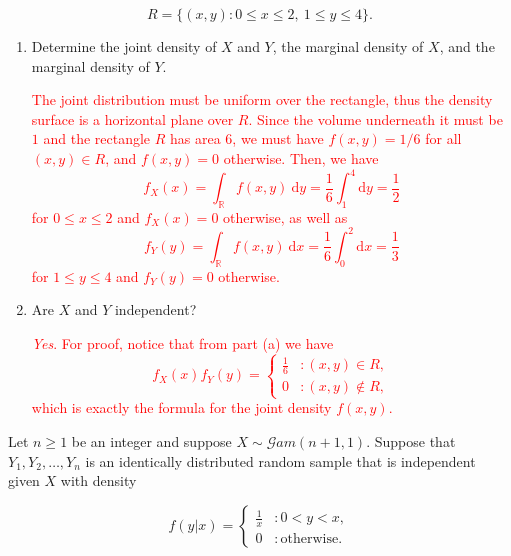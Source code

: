 \documentclass[12pt,reqno]{amsart}
\begin{document}
	\[
	R=\{(x,y) : 0\leq x \leq 2, \ 1\leq y\leq 4\}.
	\]

\medskip
\begin{enumerate}
\item Determine the joint density of $X$ and $Y$, the marginal density of $X$, and the marginal density of $Y$.

\bigskip
\textcolor{red}{The joint distribution must be uniform over the rectangle, thus the density surface is a horizontal plane over $R$. Since the volume underneath it must be $1$ and the rectangle $R$ has area $6$, we must have $f(x,y) = 1/6$ for all $(x,y)\in R$, and $f(x,y) =0$ otherwise. Then, we have
	\[
	f_X(x) = \int_{\mathbb{R}} f(x,y) \ \text{d} y = \frac{1}{6} \int_1^4 \text{d} y = \frac{1}{2}
	\]
for $0 \leq x \leq 2$ and $f_X(x) =0$ otherwise, as well as
	\[
	f_Y(y) = \int_{\mathbb{R}} f(x,y) \ \text{d} x = \frac{1}{6} \int_0^2 \text{d} x = \frac{1}{3}
	\]
for $1 \leq y \leq 4$ and $f_Y(y)=0$ otherwise.}
\bigskip

\item Are $X$ and $Y$ independent?

\bigskip
\textcolor{red}{\textit{Yes}. For proof, notice that from part (a) we have
	\[
	f_X(x) f_Y(y) = \begin{cases}
	\frac{1}{6} & : (x,y) \in R, \\
	0 & : (x,y) \notin R,
	\end{cases}
	\]
which is exactly the formula for the joint density $f(x,y)$.}
\end{enumerate}
\bigskip











\prob Let $n\geq 1$ be an integer and suppose $X \sim \mathcal{G}am(n+1,1)$. Suppose that $Y_1,Y_2,\ldots,Y_n$ is an identically distributed random sample that is independent given $X$ with density

	\[
	f(y|x) = \begin{cases}
	\frac{1}{x} & : 0 < y < x, \\
	0 & : \text{otherwise}.
	\end{cases}
	\]
	
\end{document}
